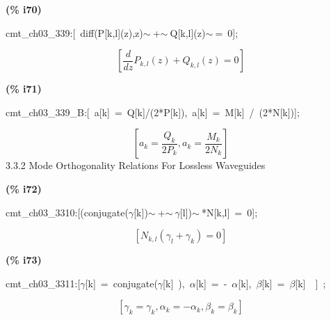 \documentclass[fleqn]{article}
\begin{document}
\noindent
\begin{minipage}[t]{4.000000em}\color{red}\bfseries
(\% i70)	
\end{minipage}
\begin{minipage}[t]{\textwidth}\color{blue}
cmt\_ch03\_339:[\ diff(P[k,l](z),z)\ensuremath{\sim\ }+\ensuremath{\sim\ }Q[k,l](z)\ensuremath{\sim\ }=\ 0];
\end{minipage}
\[\displaystyle \tag{cmt\_ ch03\_ 339} 
\left[ \frac{d}{d z} {P_{k,l}}(z)+{Q_{k,l}}(z)=0\right] \mbox{}
\]


\noindent
\begin{minipage}[t]{4.000000em}\color{red}\bfseries
(\% i71)	
\end{minipage}
\begin{minipage}[t]{\textwidth}\color{blue}
cmt\_ch03\_339\_B:[\ a[k]\ =\ Q[k]/(2*P[k]),\ a[k]\ =\ M[k]\ /\ (2*N[k])];
\end{minipage}
\[\displaystyle \tag{cmt\_ ch03\_ 339\_ B} 
\left[ {a_k}=\frac{{Q_k}}{2 {P_k}}\operatorname{,}{a_k}=\frac{{M_k}}{2 {N_k}}\right] \mbox{}
\]
3.3.2 Mode Orthogonality Relations For Lossless Waveguides


\noindent
\begin{minipage}[t]{4.000000em}\color{red}\bfseries
(\% i72)	
\end{minipage}
\begin{minipage}[t]{\textwidth}\color{blue}
cmt\_ch03\_3310:[(conjugate(\ensuremath{\gamma}[k])\ensuremath{\sim\ }+\ensuremath{\sim\ }\ensuremath{\gamma}[l])\ensuremath{\sim\ }*N[k,l]\ =\ 0];
\end{minipage}
\[\displaystyle \tag{cmt\_ ch03\_ 3310} 
\left[ {N_{k,l}} \left( {{\gamma }_l}+{{\gamma }_k}\right) =0\right] \mbox{}
\]


\noindent
\begin{minipage}[t]{4.000000em}\color{red}\bfseries
(\% i73)	
\end{minipage}
\begin{minipage}[t]{\textwidth}\color{blue}
cmt\_ch03\_3311:[\ensuremath{\gamma}[k]\ =\ conjugate(\ensuremath{\gamma}[k]\ ),\ \ensuremath{\alpha}[k]\ =\ -\ \ensuremath{\alpha}[k],\ \ensuremath{\beta}[k]\ =\ \ensuremath{\beta}[k]\ \ ]\ ;
\end{minipage}
\[\displaystyle \tag{cmt\_ ch03\_ 3311} 
\left[ {{\gamma }_k}={{\gamma }_k}\operatorname{,}{{\alpha }_k}=-{{\alpha }_k}\operatorname{,}{{\beta }_k}={{\beta }_k}\right] \mbox{}
\]
\end{document}
